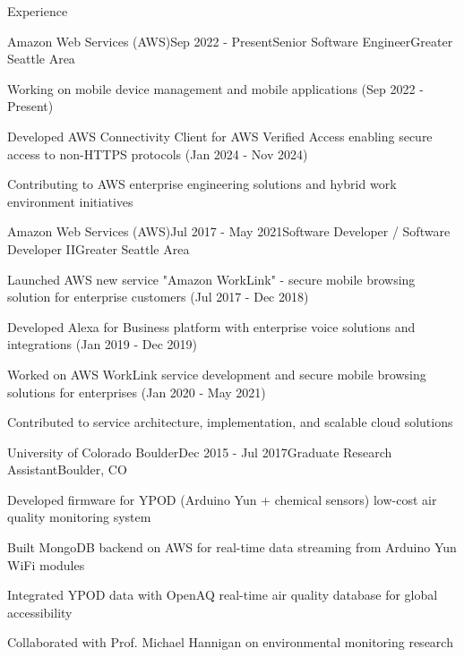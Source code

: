 
\begin{rSection}{Experience}

\begin{rSubsection}{Amazon Web Services (AWS)}{Sep 2022 - Present}{Senior Software Engineer}{Greater Seattle Area}
\item Working on mobile device management and mobile applications (Sep 2022 - Present)
\item Developed AWS Connectivity Client for AWS Verified Access enabling secure access to non-HTTPS protocols (Jan 2024 - Nov 2024)
\item Contributing to AWS enterprise engineering solutions and hybrid work environment initiatives
\end{rSubsection}

\begin{rSubsection}{Amazon Web Services (AWS)}{Jul 2017 - May 2021}{Software Developer / Software Developer II}{Greater Seattle Area}
\item Launched AWS new service "Amazon WorkLink" - secure mobile browsing solution for enterprise customers (Jul 2017 - Dec 2018)
\item Developed Alexa for Business platform with enterprise voice solutions and integrations (Jan 2019 - Dec 2019)
\item Worked on AWS WorkLink service development and secure mobile browsing solutions for enterprises (Jan 2020 - May 2021)
\item Contributed to service architecture, implementation, and scalable cloud solutions
\end{rSubsection}

\begin{rSubsection}{University of Colorado Boulder}{Dec 2015 - Jul 2017}{Graduate Research Assistant}{Boulder, CO}
\item Developed firmware for YPOD (Arduino Yun + chemical sensors) low-cost air quality monitoring system
\item Built MongoDB backend on AWS for real-time data streaming from Arduino Yun WiFi modules
\item Integrated YPOD data with OpenAQ real-time air quality database for global accessibility
\item Collaborated with Prof. Michael Hannigan on environmental monitoring research
\end{rSubsection}


\end{rSection}
